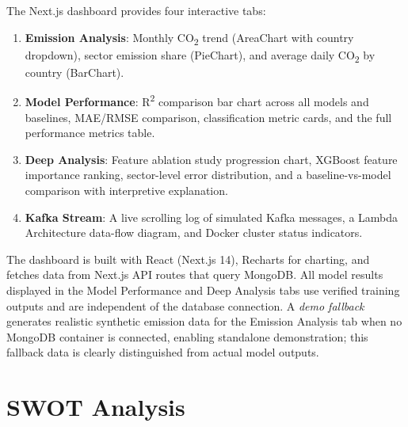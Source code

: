 \documentclass[conference]{IEEEtran}
\begin{document}
The Next.js dashboard provides four interactive tabs:

\begin{enumerate}
    \item \textbf{Emission Analysis}: Monthly CO\textsubscript{2} trend
          (AreaChart with country dropdown), sector emission share (PieChart), and
          average daily CO\textsubscript{2} by country (BarChart).
    \item \textbf{Model Performance}: R\textsuperscript{2} comparison bar chart across all models
          and baselines, MAE/RMSE comparison, classification metric cards,
          and the full performance metrics table.
    \item \textbf{Deep Analysis}: Feature ablation study progression chart,
          XGBoost feature importance ranking, sector-level error distribution,
          and a baseline-vs-model comparison with interpretive explanation.
    \item \textbf{Kafka Stream}: A live scrolling log of simulated Kafka
          messages, a Lambda Architecture data-flow diagram, and Docker
          cluster status indicators.
\end{enumerate}

The dashboard is built with React (Next.js 14), Recharts for charting,
and fetches data from Next.js API routes that query MongoDB.
All model results displayed in the Model Performance and Deep Analysis tabs use verified training outputs and are independent of the database connection.
A \textit{demo fallback} generates realistic synthetic emission data for the Emission Analysis tab when no MongoDB
container is connected, enabling standalone demonstration; this fallback data is clearly distinguished from actual model outputs.

\section{SWOT Analysis}
\end{document}

